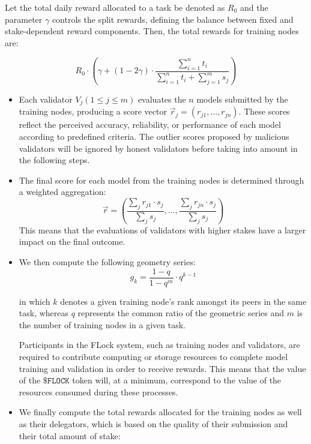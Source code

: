 \documentclass[conference]{IEEEtran}
\newcommand{\FML}{\ensuremath{\xspace\texttt{\$FLOCK}}\xspace}
\begin{document}
Let the total daily reward allocated to a task be denoted as $R_0$ and the parameter $\gamma$ controls the split rewards, defining the balance between fixed and stake-dependent reward components. Then, the total rewards for training nodes are:

    $$R_0 \cdot \left( \gamma + (1 - 2\gamma) \cdot \frac{\sum_{i=1}^{n} t_i}{\sum_{i=1}^{n} t_i + \sum_{j=1}^{m} s_j} \right)$$



\begin{itemize}

    \item Each validator $V_j (1\leq j\leq m)$ evaluates the $n$ models submitted by the training nodes, producing a score vector $\vec{r}_j = (r_{j1}, \ldots, r_{jn})$. These scores reflect the perceived accuracy, reliability, or performance of each model according to predefined criteria. The outlier scores proposed by malicious validators will be ignored by honest validators  before taking into amount in the following steps.
    
    \item The final score for each model from the training nodes is determined through a weighted aggregation:
    \[
    \vec{r} = \left(\frac{\sum_{j}{r_{j1}\cdot s_j}}{\sum_{j}{s_j}}, \ldots, \frac{\sum_{j}{r_{jn}\cdot s_j}}{\sum_{j}{s_j}}\right)
    \]
    This means that the evaluations of validators with higher stakes have a larger impact on the final outcome.
    
    \item We then compute the following geometry series:
    \[
    g_k =  \frac{1 - q}{1 - q^m} \cdot q^{k-1}
    \]
    
in which $k$ denotes a given training node's rank amongst its peers in the same task, whereas $q$ represents the common ratio of the geometric series and $m$ is the number of training nodes in a given task.

Participants in the FLock system, such as training nodes and validators, are required to contribute computing or storage resources to complete model training and validation in order to receive rewards. This means that the value of the \FML token will, at a minimum, correspond to the value of the resources consumed during these processes.

\item We finally compute the total rewards allocated for the training nodes as well as their delegators, which is based on the quality of their submission and their total amount of stake:


\end{itemize}
\end{document}
